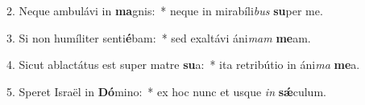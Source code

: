 2. Neque ambulávi in \textbf{ma}gnis:~*  neque in mirabíli\textit{bus} \textbf{su}per me.\

3. Si non humíliter senti\textbf{é}bam:~*  sed exaltávi áni\textit{mam} \textbf{me}am.\

4. Sicut ablactátus est super matre \textbf{su}a:~*  ita retribútio in áni\textit{ma} \textbf{me}a.\

5. Speret Israël in \textbf{Dó}mino:~*  ex hoc nunc et usque \textit{in} \textbf{sǽ}culum.\

